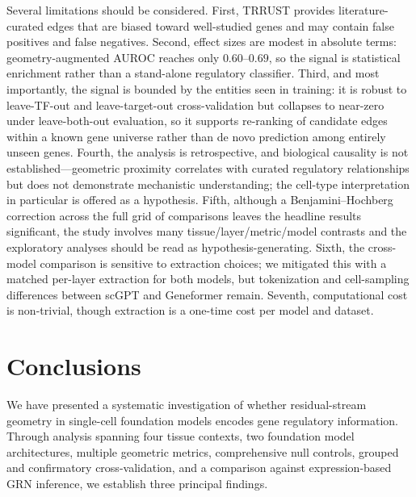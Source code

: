 \documentclass[11pt]{article}
\begin{document}
Several limitations should be considered.
First, TRRUST provides literature-curated edges that are biased toward well-studied genes and may contain false positives and false negatives.
Second, effect sizes are modest in absolute terms: geometry-augmented AUROC reaches only $0.60$--$0.69$, so the signal is statistical enrichment rather than a stand-alone regulatory classifier.
Third, and most importantly, the signal is bounded by the entities seen in training: it is robust to leave-TF-out and leave-target-out cross-validation but collapses to near-zero under leave-both-out evaluation, so it supports re-ranking of candidate edges within a known gene universe rather than de novo prediction among entirely unseen genes.
Fourth, the analysis is retrospective, and biological causality is not established---geometric proximity correlates with curated regulatory relationships but does not demonstrate mechanistic understanding; the cell-type interpretation in particular is offered as a hypothesis.
Fifth, although a Benjamini--Hochberg correction across the full grid of comparisons leaves the headline results significant, the study involves many tissue/layer/metric/model contrasts and the exploratory analyses should be read as hypothesis-generating.
Sixth, the cross-model comparison is sensitive to extraction choices; we mitigated this with a matched per-layer extraction for both models, but tokenization and cell-sampling differences between scGPT and Geneformer remain.
Seventh, computational cost is non-trivial, though extraction is a one-time cost per model and dataset.


\section*{Conclusions}

We have presented a systematic investigation of whether residual-stream geometry in single-cell foundation models encodes gene regulatory information.
Through analysis spanning four tissue contexts, two foundation model architectures, multiple geometric metrics, comprehensive null controls, grouped and confirmatory cross-validation, and a comparison against expression-based GRN inference, we establish three principal findings.
\end{document}
